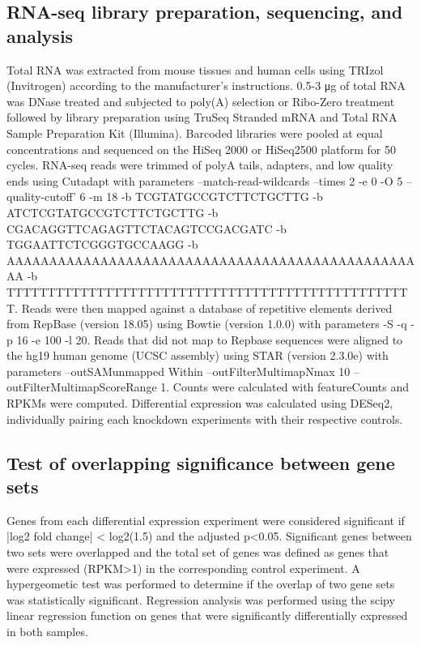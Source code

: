 \subsection{RNA-seq library preparation, sequencing, and analysis}
Total RNA was extracted from mouse tissues and human cells using TRIzol (Invitrogen) according to the manufacturer’s instructions. 0.5-3 μg of total RNA was DNase treated and subjected to poly(A) selection or Ribo-Zero treatment followed by library preparation using TruSeq Stranded mRNA and Total RNA Sample Preparation Kit (Illumina). Barcoded libraries were pooled at equal concentrations and sequenced on the HiSeq 2000 or HiSeq2500 platform for 50 cycles. RNA-seq reads were trimmed of polyA tails, adapters, and low quality ends using Cutadapt\cite{Martin2011} with parameters --match-read-wildcards --times 2 -e 0 -O 5 --quality-cutoff' 6 -m 18 -b TCGTATGCCGTCTTCTGCTTG -b ATCTCGTATGCCGTCTTCTGCTTG -b CGACAGGTTCAGAGTTCTACAGTCCGACGATC -b TGGAATTCTCGGGTGCCAAGG -b AAAAAAAAAAAAAAAAAAAAAAAAAAAAAAAAAAAAAAAAAAAAAAAAAA -b TTTTTTTTTTTTTTTTTTTTTTTTTTTTTTTTTTTTTTTTTTTTTTTTTT. Reads were then mapped against a database of repetitive elements derived from RepBase (version 18.05) using Bowtie (version 1.0.0) with parameters -S -q -p 16 -e 100 -l 20\cite{Langmead2009}. Reads that did not map to Repbase sequences were aligned to the hg19 human genome (UCSC assembly) using STAR (version 2.3.0e)\cite{Dobin2013a} with parameters --outSAMunmapped Within –outFilterMultimapNmax 10 –outFilterMultimapScoreRange 1.  Counts were calculated with featureCounts\cite{Liao2014} and RPKMs were computed. Differential expression was calculated using DESeq2\cite{Love2014}, individually pairing each knockdown experiments with their respective controls.

\subsection{Test of overlapping significance between gene sets}
Genes from each differential expression experiment were considered significant if |log2 fold change| < log2(1.5) and the adjusted p<0.05. Significant genes between two sets were overlapped and the total set of genes was defined as genes that were expressed (RPKM>1) in the corresponding control experiment. A hypergeometic test was performed to determine if the overlap of two gene sets was statistically significant. Regression analysis was performed using the scipy linear regression function on genes that were significantly differentially expressed in both samples.

